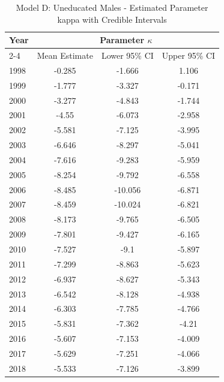 \begin{landscape}
\begin{table}[htbp]
\centering
\caption{Model D: Uneducated Males - Estimated Parameter kappa  with Credible Intervals}
\label{tab:parameters_k29}
\begin{tabular}{@{}lccc@{}}
\toprule
Year & \multicolumn{3}{c}{Parameter \(\kappa\)} \\
\cmidrule(lr){2-4}
      & Mean Estimate & Lower 95\% CI & Upper 95\% CI \\
\midrule
1998 & -0.285 & -1.666 & 1.106 \\
1999 & -1.777 & -3.327 & -0.171 \\
2000 & -3.277 & -4.843 & -1.744 \\
2001 & -4.55 & -6.073 & -2.958 \\
2002 & -5.581 & -7.125 & -3.995 \\
2003 & -6.646 & -8.297 & -5.041 \\
2004 & -7.616 & -9.283 & -5.959 \\
2005 & -8.254 & -9.792 & -6.558 \\
2006 & -8.485 & -10.056 & -6.871 \\
2007 & -8.459 & -10.024 & -6.821 \\
2008 & -8.173 & -9.765 & -6.505 \\
2009 & -7.801 & -9.427 & -6.165 \\
2010 & -7.527 & -9.1 & -5.897 \\
2011 & -7.299 & -8.863 & -5.623 \\
2012 & -6.937 & -8.627 & -5.343 \\
2013 & -6.542 & -8.128 & -4.938 \\
2014 & -6.303 & -7.785 & -4.766 \\
2015 & -5.831 & -7.362 & -4.21 \\
2016 & -5.607 & -7.153 & -4.009 \\
2017 & -5.629 & -7.251 & -4.066 \\
2018 & -5.533 & -7.126 & -3.899 \\
\bottomrule
\end{tabular}
\end{table}
\end{landscape}